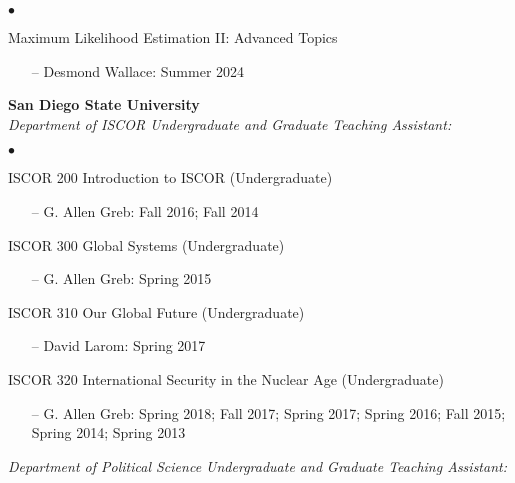 \documentclass[letterpaper,12pt]{article}
\newenvironment{list2}{
  \begin{list}{$\bullet$}{%
      \setlength{\itemsep}{0in}
      \setlength{\parsep}{0in} 
      \setlength{\parskip}{0in}
      \setlength{\topsep}{0in} 
      \setlength{\partopsep}{0in}
      \setlength{\leftmargin}{1in}
      \setlength{\labelsep}{1em}
      \setlength{\labelwidth}{1em}
      \setlength{\itemindent}{-2em}
      \setlength{\listparindent}{2em}}}{\end{list}}
\begin{document}
\begin{list2}
    \item Maximum Likelihood Estimation II: Advanced Topics
        \begin{enumerate}[leftmargin=!,labelindent=0pt,itemindent=-15pt]
            \item[--] Desmond Wallace: Summer 2024
        \end{enumerate}
\end{list2}
\par
\textbf{San Diego State University}\\
\textit{Department of ISCOR Undergraduate and Graduate Teaching Assistant:}
\begin{list2}
    \item ISCOR 200 Introduction to ISCOR (Undergraduate)
        \begin{enumerate}[leftmargin=!,labelindent=0pt,itemindent=-15pt]
            \item[--] G. Allen Greb: Fall 2016; Fall 2014
        \end{enumerate}
    \item ISCOR 300 Global Systems (Undergraduate)
        \begin{enumerate}[leftmargin=!,labelindent=0pt,itemindent=-15pt]
            \item[--] G. Allen Greb: Spring 2015
        \end{enumerate}
    \item ISCOR 310 Our Global Future (Undergraduate)
        \begin{enumerate}[leftmargin=!,labelindent=0pt,itemindent=-15pt]
            \item[--] David Larom: Spring 2017
        \end{enumerate}
    \item ISCOR 320 International Security in the Nuclear Age (Undergraduate)
        \begin{enumerate}[leftmargin=!,labelindent=0pt,itemindent=-15pt]
            \item[--]  G. Allen Greb: Spring 2018; Fall 2017; Spring 2017; Spring 2016; Fall 2015; Spring 2014; Spring 2013
        \end{enumerate}
\end{list2}
\par
\textit{Department of Political Science Undergraduate and Graduate Teaching Assistant:}
\end{document}
